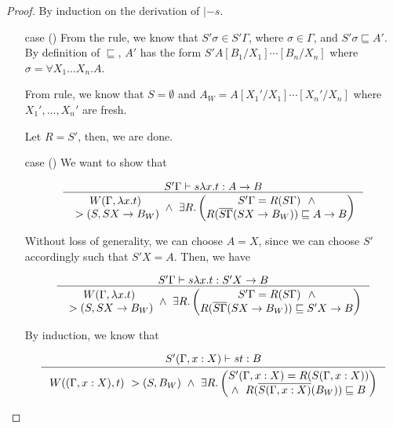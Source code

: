 \begin{proof}
By induction on the derivation of $|-s$.
\begin{itemize}
\item[case]()
	From the  rule, we know that
	$S'\sigma \in S'\Gamma$, where $\sigma\in\Gamma$,
	and $S'\sigma\sqsubseteq A'$.
	By definition of $\sqsubseteq$, $A'$ has the form
	$S'A[B_1/X_1]\cdots[B_n/X_n]$ where $\sigma = \forall X_1\dots X_n.A$.

	From  rule, we know that
	$S = \emptyset $ and $A_W = A[X_1'/X_1]\cdots[X_n'/X_n]$
	where $X_1',\dots,X_n'$ are fresh.

	Let $R=S'$, then, we are done.

\item[case]()
	We want to show that \vspace*{-2em}
	\begin{singlespace}
	\[\inference{S'\Gamma |-s \l x.t : A -> B}{
	\begin{matrix} W(\Gamma,\l x.t) \\ ~> (S,S X -> B_W) \end{matrix}
	~\land~
	\exists R.
		\left(\begin{matrix}
			S'\Gamma=R(S\Gamma) ~~ \land \\
			R(\overline{S\Gamma}(SX -> B_W))\sqsubseteq A -> B
		\end{matrix}\right) } \]
	\end{singlespace}

	Without loss of generality, we can choose $A = X$,
	since we can choose $S'$ accordingly such that $S'X = A$.
	Then, we have \vspace*{-2em}
	\begin{singlespace}
	\[\inference{S'\Gamma |-s \l x.t : S'X -> B}{
	\begin{matrix} W(\Gamma,\l x.t) \\ ~> (S,S X -> B_W) \end{matrix}
	~\land~
	\exists R.
		\left(\begin{matrix}
			S'\Gamma=R(S\Gamma) ~~ \land \\
			R(\overline{S\Gamma}(SX -> B_W))\sqsubseteq S'X -> B
		\end{matrix}\right) } \]
	\end{singlespace}

	By induction, we know that  \vspace*{-2em}
	\begin{singlespace}
	\[\inference{S'(\Gamma,x:X) |-s t : B}{
	W((\Gamma, x:X),t) ~> (S,B_W) ~\land~
	\exists R.
		\left(\begin{matrix}
			S'(\Gamma,x:X)=R(S(\Gamma,x:X)) \\ \land~\;
			R(\overline{S(\Gamma,x:X)}(B_W))\sqsubseteq B
		\end{matrix}\right) } \]
	\end{singlespace}


\end{itemize}
\end{proof}
